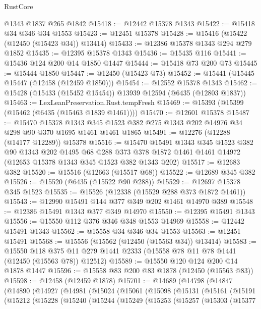 \begin{lexlean}{RustCore}
\begin{coremodule}
    @1343
    @1837
    @265
    @1842
@15418 := @12442 @15378 @1343
@15422 := @15418 @34 @346 @34 @1553
@15423 := @12451 @15378
@15428 := @15416 (@15422 (@12450 (@15423 @34)) @13414)
@15433 := @12386 @15378 @1343 @294 @279 @1852
@15435 := @12395 @15378 @1343
@15436 := @15435 @116
@15441 := @15436 @124 @200 @14 @1850 @1447
@15444 := @15418 @73 @200 @73
@15445 := @15444 @1850
@15447 := @12450 (@15423 @73)
@15452 := @15441 (@15445 @15447 (@12458 (@12459 @1850)))
@15454 := @12552 @15378 @1343
@15462 := @15428 (@15433 (@15452 @15454)) @13939 @12594 (@6435 (@12803 @1837))
@15463 := LexLeanPreservation.Rust.tempFresh
@15469 := @15393 (@15399 (@15462 (@6435 (@15463 @1839 @1461))))
@15470 := @12601 @15378
@15487 := @15470
    @15378
    @1343
    @345
    @1523
    @382
    @275
    @1343
    @202
    @14976
    @34
    @298
    @90
    @370
    @1695
    @1461
    @1461
    @1865
@15491 := @12276 (@12288 (@14177 @12289)) @15378
@15516 := @15470
    @15491
    @1343
    @345
    @1523
    @382
    @90
    @1343
    @202
    @1495
    @68
    @288
    @373
    @378
    @1872
    @1461
    @1461
    @14972
    (@12653 @15378 @1343 @345 @1523 @382 @1343 @202)
@15517 := @12683 @382
@15520 := @15516 (@12663 (@15517 @68))
@15522 := @12689 @345 @382
@15526 := @15520 (@6435 (@15522 @90 @288))
@15529 := @12697 @15378 @345 @1523
@15535 := @15526 (@12338 (@15529 @288 @373 @1872 @1461))
@15543 := @12990 @15491 @144 @377 @349 @202 @1461 @14970 @389
@15548 := @12386 @15491 @1343 @377 @349 @14970
@15550 := @12395 @15491 @1343
@15556 := @15550 @112 @376 @346 @348 @1553 @14969
@15558 := @12442 @15491 @1343
@15562 := @15558 @34 @346 @34 @1553
@15563 := @12451 @15491
@15568 := @15556 (@15562 (@12450 (@15563 @34)) @13414)
@15583 := @15550
    @118
    @375
    @11
    @279
    @1441
    @2333
    (@15558 @78 @11 @78 @1441 (@12450 (@15563 @78)) @12512)
@15589 := @15550 @120 @124 @200 @14 @1878 @1447
@15596 := @15558 @83 @200 @83 @1878 (@12450 (@15563 @83))
@15598 := @12458 (@12459 @1878)
@15701 := @14689
    (@14798
      (@14847
        (@14890
          (@14927
            (@14981
              (@15024
                (@15061
                  (@15098
                    (@15131
                      (@15161
                        (@15191
                          (@15212
                            (@15228
                              (@15240
                                (@15244
                                  (@15249
                                    (@15253
                                      (@15257
                                        (@15303
                                          (@15377

\end{coremodule}
\end{lexlean}
